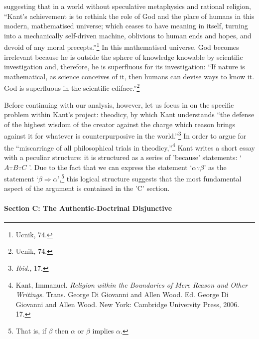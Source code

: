 \documentclass[12pt]{article}
\begin{document}
 suggesting that in a world without speculative metaphysics and rational religion, ``Kant's achievement is to rethink the role of God and the place of humans in this modern, mathematised universe; which ceases to have meaning in itself, turning into a mechanically self-driven machine, oblivious to human ends and  hopes, and devoid of any moral precepts.''\footnote{Ucnik, 74.} In this mathematised universe, God becomes irrelevant because he is outside the sphere of knowledge knowable by scientific investigation and, therefore, he is superfluous for its investigation: ``If nature is mathematical, as science conceives of it, then humans can devise ways to know it. God is superfluous in the scientific ediface.''\footnote{Ucnik, 74.}


  





Before continuing with our analysis, however, let us focus in on the specific problem within Kant's project: theodicy, by which Kant understands ``the defense of the highest wisdom of the creator against the charge which reason brings against it for whatever is counterpurposive in the world.''\footnote{\emph{Ibid.}, 17.} In order to argue for the ``miscarriage of all philosophical trials in theodicy,''\footnote{Kant, Immanuel. \emph{Religion within the Boundaries of Mere Reason and Other Writings.} Trans. George Di Giovanni and Allen Wood. Ed. George Di Giovanni and Allen Wood. New York: Cambridge University Press, 2006. 17.} Kant writes a short essay with a peculiar structure: it is structured as a series of 'because' statements: `$ A \because   B\because C$ '. Due to the fact that we can express the statement `$ \alpha \because \beta $'  as the statement `$\beta \Rightarrow \alpha $',\footnote{That is, if $\beta$ then $\alpha$ or $\beta$ implies $\alpha$.} this logical structure suggests that the most fundamental aspect of the argument is contained in the 'C' section. 

\paragraph*{Section C: The Authentic-Doctrinal Disjunctive}


	
	
	
	

 \begin{comment}
 \begin{quote}
	 \singlespacing
	 \footnotesize
	 
	 And about three o'clock Jesus cried with a loud voice, ``Eli, Eli, lema sabachtani?'' that is, ``My God, my God, why have you forsaken me?'' [Mt 27:46]
	 
 \end{quote}
 \end{comment}
 
\end{document}
